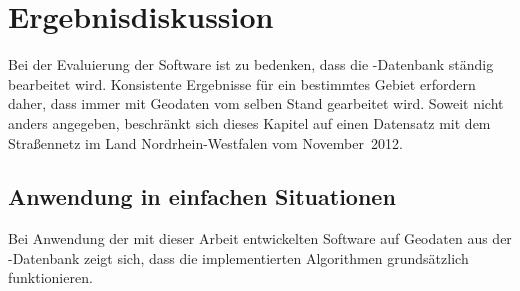 \documentclass[../main/thesis.tex]{subfiles}
\begin{document}
\chapter{Ergebnisdiskussion}


Bei der Evaluierung der Software ist zu bedenken, dass die \osm-Datenbank ständig bearbeitet wird.
Konsistente Ergebnisse für ein bestimmtes Gebiet erfordern daher, dass immer mit Geodaten vom selben Stand gearbeitet wird.
Soweit nicht anders angegeben, beschränkt sich dieses Kapitel auf einen Datensatz mit dem Straßennetz im Land Nordrhein-Westfalen vom November~2012.




\section{Anwendung in einfachen Situationen}

Bei Anwendung der mit dieser Arbeit entwickelten Software auf Geodaten aus der \osm-Datenbank zeigt sich, dass die implementierten Algorithmen grundsätzlich funktionieren.

\end{document}
